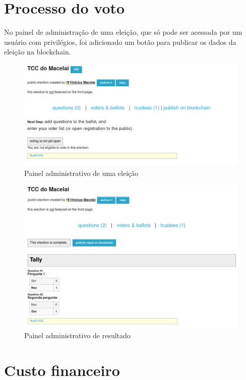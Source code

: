 \documentclass{ufsctex/ufsctex}
\begin{document}
\section{Processo do voto}

No painel de administração de uma eleição, que só pode ser acessada por um usuário com privilégios, foi adicionado um botão para publicar os dados da eleição na blockchain.

\begin{figure}[H]
	\centering
	\includegraphics[width=\linewidth]{helios-1}
	\caption{Painel administrativo de uma eleição}
	\label{fig:helios-1}
\end{figure}

\begin{figure}[H]
	\centering
	\includegraphics[width=\linewidth]{helios-2}
	\caption{Painel administrativo de resultado}
	\label{fig:helios-2}
\end{figure}


\section{Custo financeiro}
\end{document}
